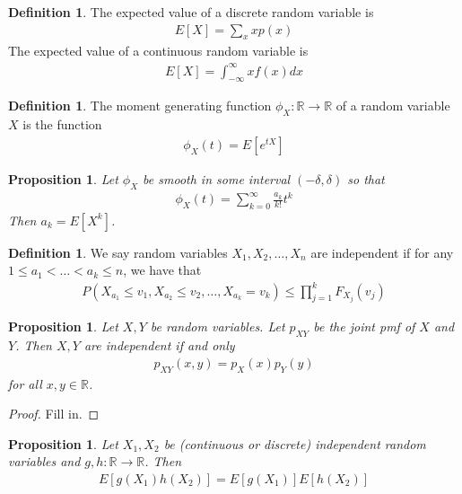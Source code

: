 \documentclass[11pt]{amsart}
\newtheorem{proposition}[theorem]{Proposition}
\theoremstyle{definition}
\newtheorem{definition}[theorem]{Definition}
\numberwithin{equation}{section}
\begin{document}
\begin{definition}
    The expected value of a discrete random variable is
    \begin{align*}
        E[X]=\sum_{x}xp(x)
    \end{align*}
    The expected value of a continuous random variable is
    \begin{align*}
        E[X]=\int_{-\infty}^\infty xf(x)dx
    \end{align*}
\end{definition}
\begin{definition}
    The moment generating function $\phi_X:\mathbb R\to\mathbb R$ of a random variable $X$ is the function
    \begin{align*}
        \phi_X(t)=E[e^{tX}]
    \end{align*}
\end{definition}
\begin{proposition}
    Let $\phi_X$ be smooth in some interval $(-\delta,\delta)$ so that
    \begin{align*}
        \phi_X(t)=\sum_{k=0}^\infty\frac{a_k}{k!}t^k
    \end{align*}
    Then $a_k=E[X^k]$.
\end{proposition}
\begin{definition}
    We say random variables $X_1,X_2,\ldots,X_n$ are independent if for any $1\le a_1<\ldots<a_k\le n$, we have that 
    \begin{align*}
        P(X_{a_1}\le v_1,X_{a_2}\le v_2,\ldots,X_{a_k}=v_k)\le\prod_{j=1}^kF_{X_j}(v_j)
    \end{align*}
\end{definition}
\begin{proposition}
    Let $X,Y$ be random variables. Let $p_{XY}$ be the joint pmf of $X$ and $Y$. Then $X,Y$ are independent if and only 
    \begin{align*}
        p_{XY}(x,y)=p_X(x)p_Y(y)
    \end{align*}
    for all $x,y\in\mathbb R$.
\end{proposition}
\begin{proof}
    Fill in.
\end{proof}
\begin{proposition}
    Let $X_1,X_2$ be (continuous or discrete) independent random variables and $g,h:\mathbb R\to\mathbb R$. Then
    \begin{align*}
        E[g(X_1)h(X_2)]=E[g(X_1)]E[h(X_2)]
    \end{align*}
\end{proposition}
\end{document}
